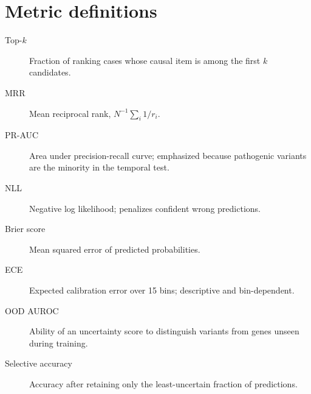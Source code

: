 \documentclass[11pt]{article}
\begin{document}
\section{Metric definitions}

\begin{description}
\item[Top-$k$] Fraction of ranking cases whose causal item is among the first $k$ candidates.
\item[MRR] Mean reciprocal rank, $N^{-1}\sum_i 1/r_i$.
\item[PR-AUC] Area under precision-recall curve; emphasized because pathogenic variants are the minority in the temporal test.
\item[NLL] Negative log likelihood; penalizes confident wrong predictions.
\item[Brier score] Mean squared error of predicted probabilities.
\item[ECE] Expected calibration error over 15 bins; descriptive and bin-dependent.
\item[OOD AUROC] Ability of an uncertainty score to distinguish variants from genes unseen during training.
\item[Selective accuracy] Accuracy after retaining only the least-uncertain fraction of predictions.
\end{description}




\end{document}
